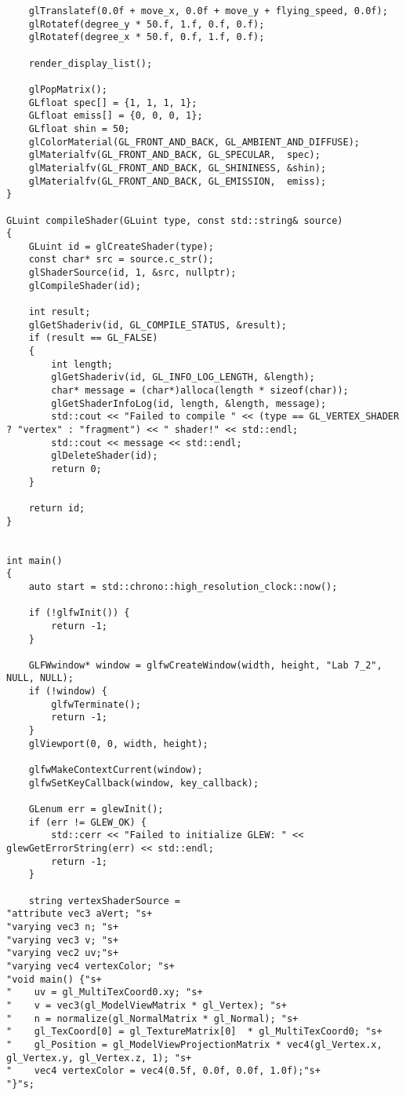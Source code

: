 \documentclass[a4paper, 14pt]{extarticle}
\begin{document}
\begin{verbatim}
    glTranslatef(0.0f + move_x, 0.0f + move_y + flying_speed, 0.0f);
    glRotatef(degree_y * 50.f, 1.f, 0.f, 0.f);
    glRotatef(degree_x * 50.f, 0.f, 1.f, 0.f);

    render_display_list();

    glPopMatrix();
    GLfloat spec[] = {1, 1, 1, 1};
    GLfloat emiss[] = {0, 0, 0, 1};
    GLfloat shin = 50;
    glColorMaterial(GL_FRONT_AND_BACK, GL_AMBIENT_AND_DIFFUSE);
    glMaterialfv(GL_FRONT_AND_BACK, GL_SPECULAR,  spec);
    glMaterialfv(GL_FRONT_AND_BACK, GL_SHININESS, &shin);
    glMaterialfv(GL_FRONT_AND_BACK, GL_EMISSION,  emiss);
}

GLuint compileShader(GLuint type, const std::string& source)
{
    GLuint id = glCreateShader(type);
    const char* src = source.c_str();
    glShaderSource(id, 1, &src, nullptr);
    glCompileShader(id);

    int result;
    glGetShaderiv(id, GL_COMPILE_STATUS, &result);
    if (result == GL_FALSE)
    {
        int length;
        glGetShaderiv(id, GL_INFO_LOG_LENGTH, &length);
        char* message = (char*)alloca(length * sizeof(char));
        glGetShaderInfoLog(id, length, &length, message);
        std::cout << "Failed to compile " << (type == GL_VERTEX_SHADER ? "vertex" : "fragment") << " shader!" << std::endl;
        std::cout << message << std::endl;
        glDeleteShader(id);
        return 0;
    }

    return id;
}


int main()
{
    auto start = std::chrono::high_resolution_clock::now();
    
    if (!glfwInit()) {
        return -1;
    }

    GLFWwindow* window = glfwCreateWindow(width, height, "Lab 7_2", NULL, NULL);
    if (!window) {
        glfwTerminate();
        return -1;
    }
    glViewport(0, 0, width, height);

    glfwMakeContextCurrent(window);
    glfwSetKeyCallback(window, key_callback);

    GLenum err = glewInit();
    if (err != GLEW_OK) {
        std::cerr << "Failed to initialize GLEW: " << glewGetErrorString(err) << std::endl;
        return -1;
    }
   
    string vertexShaderSource =
"attribute vec3 aVert; "s+
"varying vec3 n; "s+
"varying vec3 v; "s+
"varying vec2 uv;"s+
"varying vec4 vertexColor; "s+
"void main() {"s+
"    uv = gl_MultiTexCoord0.xy; "s+
"    v = vec3(gl_ModelViewMatrix * gl_Vertex); "s+
"    n = normalize(gl_NormalMatrix * gl_Normal); "s+
"    gl_TexCoord[0] = gl_TextureMatrix[0]  * gl_MultiTexCoord0; "s+
"    gl_Position = gl_ModelViewProjectionMatrix * vec4(gl_Vertex.x, gl_Vertex.y, gl_Vertex.z, 1); "s+
"    vec4 vertexColor = vec4(0.5f, 0.0f, 0.0f, 1.0f);"s+
"}"s;


\end{verbatim}
\end{document}
